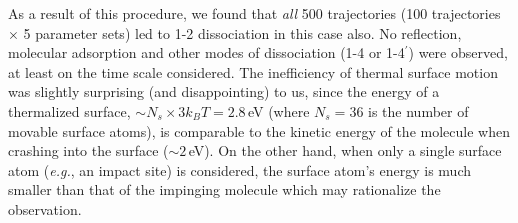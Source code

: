 \documentclass[11pt,DIV=13,BCOR=5mm,a4paper,headinclude]{scrbook}
\begin{document}
As a result of this procedure, we found that \textit{all} 500 trajectories (100 trajectories $\times$ 5 parameter sets) led to 1-2 dissociation in this case also.
No reflection, molecular adsorption and other modes of dissociation (1-4 or 1-4$^\prime$) were observed, at least on the time scale considered.
The inefficiency of thermal surface motion was slightly surprising (and disappointing) to us, since the energy of a thermalized surface, $\sim N_s \times 3 k_B T = 2.8\,$eV (where $N_s=36$ is the number of movable surface atoms), is comparable to the kinetic energy of the molecule when crashing into the surface ($\sim 2\,$eV). On the other hand, when only a single surface atom (\textit{e.g.}, an impact site) is considered, the surface atom's energy is much smaller than that of the impinging molecule which may rationalize the observation.
\\
\end{document}
